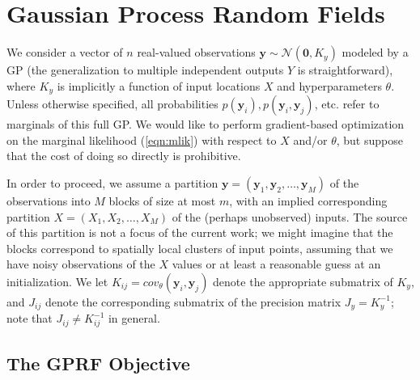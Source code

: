 \documentclass{article}
\newcommand{\N}{\mathcal{N}}
\renewcommand{\v}[1]{\mathbf{#1}}
\begin{document}





% 


\section{Gaussian Process Random Fields}
\label{sec:gprf}

We consider a vector of $n$ real-valued observations $\v{y} \sim
\N(\v{0}, K_y)$  modeled by a GP (the generalization to
multiple independent outputs $Y$ is straightforward),
where $K_y$ is implicitly a function of input locations $X$ and hyperparameters $\theta$. Unless otherwise specified, all probabilities $p(\v{y}_i),
p(\v{y}_i, \v{y}_j)$, etc. refer to marginals of this full GP. We
would like to perform gradient-based optimization on the marginal
likelihood (\ref{eqn:mlik}) with respect to $X$ and/or $\theta$, but suppose that the cost of doing so directly is prohibitive.

In order to proceed, we assume a partition $\v{y} = (\v{y}_1, \v{y}_2, \ldots,
\v{y}_M)$ of the observations into $M$ blocks of size at most $m$, with an
implied corresponding partition $X = (X_1, X_2, \ldots, X_M)$ of the
(perhaps unobserved) inputs. The source of this partition is not a focus of the current
work; we might imagine that the blocks correspond to 
spatially local clusters of input points, assuming that we have noisy
observations of the $X$ values or at least a reasonable guess at an initialization. We let $K_{ij} =
cov_\theta(\v{y}_i, \v{y}_j)$ denote the appropriate submatrix of
$K_{y}$, and $J_{ij}$ denote the corresponding submatrix of the
precision matrix $J_y=K_y^{-1}$; note that $J_{ij} \ne K_{ij}^{-1}$ in general. 

\subsection{The GPRF Objective}
\end{document}
